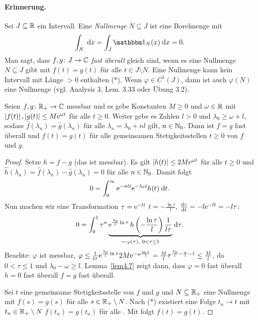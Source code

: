 \documentclass[a4paper,twoside,DIV15,BCOR12mm]{scrbook}
\begin{document}
\paragraph{Erinnerung.} Sei $J\subseteq\mathbb{R}$ ein Intervall. Eine \emph{Nullmenge} $N\subseteq J$ ist eine Borelmenge mit \[
\integral{N}{}{}{x} = \integral{J}{}{\charfnkt{N}(x)}{x} = 0. \] Man sagt, dass $f, g\colon J\to\mathbb{C}$ \emph{fast überall} gleich
sind, wenn es eine Nullmenge $N\subseteq J$ gibt mit $f(t)=g(t)$ für alle $t\in J\setminus N$. Eine Nullmenge kann kein
Intervall mit Länge $>0$ enthalten ($*$). Wenn $\varphi\in C^1(J)$, dann ist auch $\varphi(N)$ eine Nullmenge (vgl. Analysis 3,
Lem. 3.33 oder Übung 3.2).

\begin{thm}\label{thm4.6}
  Seien $f,g\colon\mathbb{R}_+\to\mathbb{C}$ messbar und es gebe Konstanten $M\ge0$ und $\omega\in\mathbb{R}$ mit $\left\lvert f(t)\right\lvert,\left\lvert g(t)\right\lvert\le M\mathrm{e}^{\omega
    t}$ für alle $t\ge0$. Weiter gebe es Zahlen $l>0$ und $\lambda_0\ge\omega+l$, sodass $\hat{f}(\lambda_n)=\hat{g}(\lambda_n)$
  für alle $\lambda_n=\lambda_0+nl$ gilt, $n\in\mathbb{N}_0$. Dann ist $f=g$ fast überall und $f(t)=g(t)$ für alle gemeinsamen
  Stetigkeitsstellen $t\ge0$ von $f$ und $g$.
\end{thm}
\begin{proof}
  Setze $h=f-g$ (das ist messbar). Es gilt $\left\lvert h(t)\right\lvert\le2M\mathrm{e}^{\omega t}$ für alle $t\ge0$ und $\hat{h}(\lambda_n) =
  \hat{f}(\lambda_n) - \hat{g}(\lambda_n) = 0$ für alle $n\in\mathbb{N}_0$. Damit folgt
  \[ 0 = \int_{0}^{\infty}{\mathrm{e}^{-nlt}\mathrm{e}^{-\lambda_0t}h(t)}\;\mathrm{d} t. \]
  Nun machen wir eine Transformation $\tau=\mathrm{e}^{-lt}$ \gdw $t=-\frac{\ln{\tau}}{l}$, $\frac{\mathrm{d}\tau}{\mathrm{d} t} = -l\mathrm{e}^{-lt} = -l\tau$:
  \[ 0 = \int_{0}^{1}{\tau^n\underbrace{\mathrm{e}^{\frac{\lambda_0}{l}\ln{\tau}}\,h\left(-\frac{\ln{\tau}}{l}\right) \frac{1}{l\tau}}
    _{=: \varphi(\tau),\ 0<\tau\le1}}\;\mathrm{d}\tau. \]
  Beachte: $\varphi$ ist messbar, $\varphi\leq\frac{1}{l\tau}\mathrm{e}^{\frac{\lambda_0}{l}\ln{\tau}}2M\mathrm{e}^{-\omega\frac{\ln{\tau}}{l}}
  = \frac{M}{l}\tau^{\frac{\lambda_0}{l}-\frac{\omega}{l}-1}\le \frac{M}{l}$, da $0<\tau\leq1$ und $\lambda_0-\omega\ge
  l$. Lemma~\ref{lem4.7} zeigt dann, dass $\varphi=0$ fast überall \folgt $h=0$ fast überall \folgt $f=g$ fast überall.

  Sei $t$ eine gemeinsame Stetigkeitsstelle von $f$ und $g$ und $N\subseteq\mathbb{R}_+$ eine Nullmenge mit $f(s)=g(s)$ für alle
  $s\in\mathbb{R}_+\setminus N$. Nach ($*$) existiert eine Folge $t_n\to t$ mit $t_n\in\mathbb{R}_+\setminus N$ \folgt $f(t_n)=g(t_n)$ für alle
  . Mit \ninf folgt $f(t)=g(t)$.
\end{proof}
\end{document}
